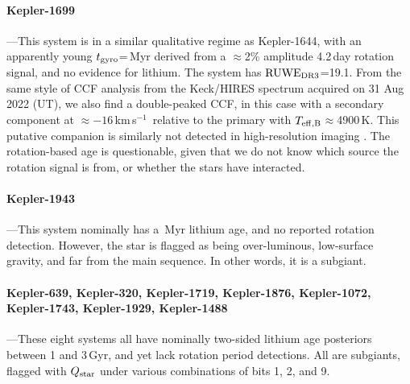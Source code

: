 \documentclass[11pt,twocolumn,tighten]{aastex63}
\newcommand{\kms}{{km\,s$^{-1}$}}
\begin{document}
\paragraph{Kepler-1699}---This system is in a similar qualitative
regime as Kepler-1644, with an apparently young $t_{\rm
gyro}$=\kepsixteenninenine\,Myr derived from a $\approx$2\% amplitude
4.2\,day rotation signal, and no evidence for lithium.  The system has
${\rm RUWE}_{\rm DR3}$=19.1.  From the same style of CCF analysis from
the Keck/HIRES spectrum acquired on 31 Aug 2022 (UT), we also find a
double-peaked CCF, in this case with a secondary component at
$\approx$$-16$\,\kms\ relative to the primary with $T_{\rm
eff,B}$$\approx$4900\,K.  This putative companion is similarly not
detected in high-resolution imaging \citep{2017AJ....153...66Z}.  The
rotation-based age is questionable, given that we do not know which
source the rotation signal is from, or whether the stars have
interacted.

\paragraph{Kepler-1943}---This system nominally has a
\kepnineteenfourthree\,Myr lithium age, and no reported rotation
detection.  However, the star is flagged as being over-luminous,
low-surface gravity, and far from the main sequence.  In other words,
it is a subgiant.

\paragraph{Kepler-639, Kepler-320, Kepler-1719, Kepler-1876,
Kepler-1072, Kepler-1743, Kepler-1929, Kepler-1488}---These eight
systems all have nominally two-sided lithium age posteriors between 1
and 3\,Gyr, and yet lack rotation period detections.  All are
subgiants, flagged with $Q_{\rm star}$ under various combinations of
bits 1, 2, and 9.


%
\end{document}
